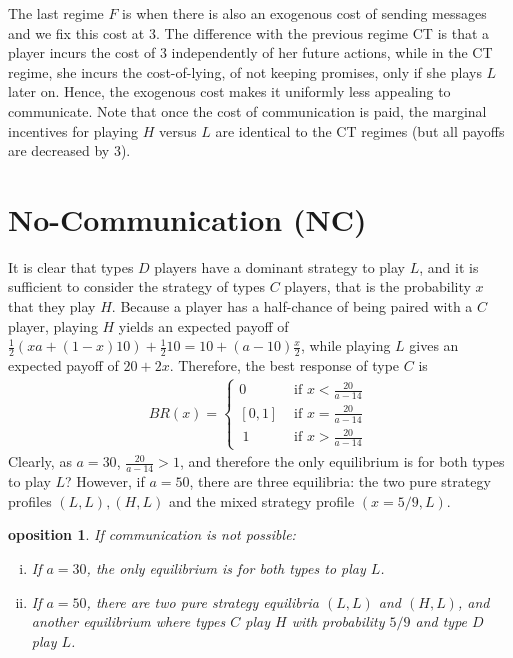 \documentclass[12pt]{article}
\newtheorem{proposition}{\text{Pr}oposition}
\theoremstyle{definition}
\theoremstyle{remark}
\begin{document}
The last regime $F$ is when there is also an exogenous cost of sending messages and we fix this cost at $3$. The difference with the previous regime CT is that a player incurs the cost of $3$ independently of her future actions, while in the CT regime, she incurs the cost-of-lying, of not keeping promises, only if she plays $L$ later on. Hence, the exogenous cost makes it uniformly less appealing to communicate. Note that once the cost of communication is paid, the marginal incentives for playing $H$ versus $L$ are identical to the CT regimes (but all payoffs are decreased by $3$).

%


\section{No-Communication  (NC)} 

\label{sec:no_communication_possible} It is clear that types $D$ players have a dominant strategy to play $L$, and it is sufficient to consider the strategy of types $C$ players, that is the probability $x$ that they play $H$. Because a player has a half-chance of being paired with a $C$ player, playing $H$ yields an expected payoff of $\frac{1}{2}(x a+(1-x)10)+\frac{1}{2}10=10+(a-10)\frac{x}{2}$, while playing $L$ gives an expected payoff of $20+ 2x$. Therefore, the best response of type $C$ is 
\begin{align*}
	BR(x)=
	\begin{cases}
		0 & \text{ if } x < \frac{20}{a-14}\\
		[0,1]&\text{ if } x = \frac{20}{a-14}\\\
		1&\text{ if }x > \frac{20}{a-14}\ 
	\end{cases}
\end{align*}
Clearly, as $a=30$, $\frac{20}{a-14}>1$, and therefore the only equilibrium is for both types to play $L$? However, if $a=50$, there are three equilibria: the two pure strategy profiles $(L,L),(H,L)$ and the mixed strategy profile $(x=5/9,L)$. 
\begin{proposition}\label{prop:nocomm} 
If communication is not possible:
	\begin{enumerate}
		[(i)] 
		\item If $a=30$, the only equilibrium is for both types to play $L$. 
		\item If $a=50$, there are two pure strategy equilibria $(L,L)$ and $(H,L)$, and another equilibrium where types $C$ play $H$ with probability $5/9$ and type $D$ play $L$. 
	\end{enumerate}
\end{proposition}
%
\end{document}
